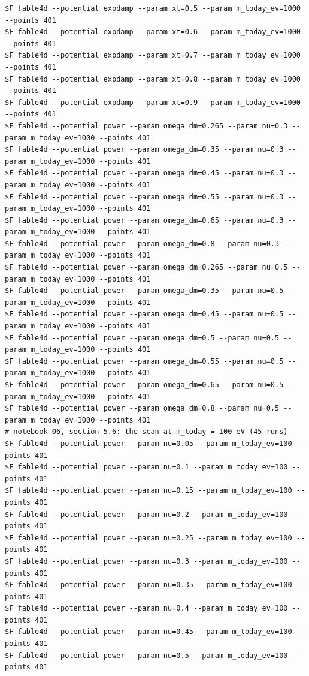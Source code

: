 \begin{Verbatim}[fontsize=\scriptsize]
$F fable4d --potential expdamp --param xt=0.5 --param m_today_ev=1000 --points 401
$F fable4d --potential expdamp --param xt=0.6 --param m_today_ev=1000 --points 401
$F fable4d --potential expdamp --param xt=0.7 --param m_today_ev=1000 --points 401
$F fable4d --potential expdamp --param xt=0.8 --param m_today_ev=1000 --points 401
$F fable4d --potential expdamp --param xt=0.9 --param m_today_ev=1000 --points 401
$F fable4d --potential power --param omega_dm=0.265 --param nu=0.3 --param m_today_ev=1000 --points 401
$F fable4d --potential power --param omega_dm=0.35 --param nu=0.3 --param m_today_ev=1000 --points 401
$F fable4d --potential power --param omega_dm=0.45 --param nu=0.3 --param m_today_ev=1000 --points 401
$F fable4d --potential power --param omega_dm=0.55 --param nu=0.3 --param m_today_ev=1000 --points 401
$F fable4d --potential power --param omega_dm=0.65 --param nu=0.3 --param m_today_ev=1000 --points 401
$F fable4d --potential power --param omega_dm=0.8 --param nu=0.3 --param m_today_ev=1000 --points 401
$F fable4d --potential power --param omega_dm=0.265 --param nu=0.5 --param m_today_ev=1000 --points 401
$F fable4d --potential power --param omega_dm=0.35 --param nu=0.5 --param m_today_ev=1000 --points 401
$F fable4d --potential power --param omega_dm=0.45 --param nu=0.5 --param m_today_ev=1000 --points 401
$F fable4d --potential power --param omega_dm=0.5 --param nu=0.5 --param m_today_ev=1000 --points 401
$F fable4d --potential power --param omega_dm=0.55 --param nu=0.5 --param m_today_ev=1000 --points 401
$F fable4d --potential power --param omega_dm=0.65 --param nu=0.5 --param m_today_ev=1000 --points 401
$F fable4d --potential power --param omega_dm=0.8 --param nu=0.5 --param m_today_ev=1000 --points 401
# notebook 06, section 5.6: the scan at m_today = 100 eV (45 runs)
$F fable4d --potential power --param nu=0.05 --param m_today_ev=100 --points 401
$F fable4d --potential power --param nu=0.1 --param m_today_ev=100 --points 401
$F fable4d --potential power --param nu=0.15 --param m_today_ev=100 --points 401
$F fable4d --potential power --param nu=0.2 --param m_today_ev=100 --points 401
$F fable4d --potential power --param nu=0.25 --param m_today_ev=100 --points 401
$F fable4d --potential power --param nu=0.3 --param m_today_ev=100 --points 401
$F fable4d --potential power --param nu=0.35 --param m_today_ev=100 --points 401
$F fable4d --potential power --param nu=0.4 --param m_today_ev=100 --points 401
$F fable4d --potential power --param nu=0.45 --param m_today_ev=100 --points 401
$F fable4d --potential power --param nu=0.5 --param m_today_ev=100 --points 401

\end{Verbatim}
